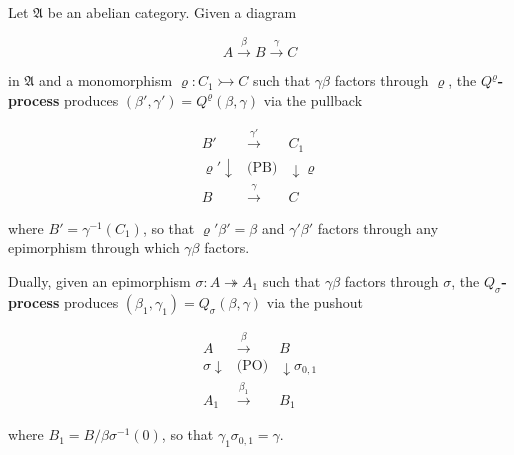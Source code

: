 Let $\mathfrak{A}$ be an abelian category. Given a diagram

$$A \xrightarrow{\beta} B \xrightarrow{\gamma} C$$

in $\mathfrak{A}$ and a monomorphism $\varrho: C_1 \rightarrowtail C$ such that $\gamma\beta$ factors through $\varrho$, the \textbf{$Q^{\varrho}$-process} produces $(\beta', \gamma') = Q^{\varrho}(\beta, \gamma)$ via the pullback

$$\begin{array}{ccc}
B' & \xrightarrow{\gamma'} & C_1 \\
\varrho' \downarrow & \text{(PB)} & \downarrow \varrho \\
B & \xrightarrow{\gamma} & C
\end{array}$$

where $B' = \gamma^{-1}(C_1)$, so that $\varrho'\beta' = \beta$ and $\gamma'\beta'$ factors through any epimorphism through which $\gamma\beta$ factors.

Dually, given an epimorphism $\sigma: A \twoheadrightarrow A_1$ such that $\gamma\beta$ factors through $\sigma$, the \textbf{$Q_{\sigma}$-process} produces $(\beta_1, \gamma_1) = Q_{\sigma}(\beta, \gamma)$ via the pushout

$$\begin{array}{ccc}
A & \xrightarrow{\beta} & B \\
\sigma \downarrow & \text{(PO)} & \downarrow \sigma_{0,1} \\
A_1 & \xrightarrow{\beta_1} & B_1
\end{array}$$

where $B_1 = B / \beta\sigma^{-1}(0)$, so that $\gamma_1\sigma_{0,1} = \gamma$.
